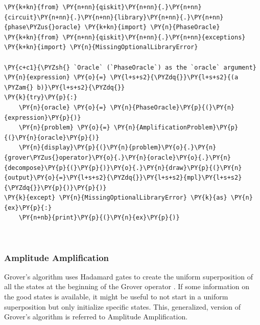     \begin{tcolorbox}[breakable, size=fbox, boxrule=1pt, pad at break*=1mm,colback=cellbackground, colframe=cellborder]
\begin{Verbatim}[commandchars=\\\{\}]
\PY{k+kn}{from} \PY{n+nn}{qiskit}\PY{n+nn}{.}\PY{n+nn}{circuit}\PY{n+nn}{.}\PY{n+nn}{library}\PY{n+nn}{.}\PY{n+nn}{phase\PYZus{}oracle} \PY{k+kn}{import} \PY{n}{PhaseOracle}
\PY{k+kn}{from} \PY{n+nn}{qiskit}\PY{n+nn}{.}\PY{n+nn}{exceptions} \PY{k+kn}{import} \PY{n}{MissingOptionalLibraryError}

\PY{c+c1}{\PYZsh{} `Oracle` (`PhaseOracle`) as the `oracle` argument}
\PY{n}{expression} \PY{o}{=} \PY{l+s+s2}{\PYZdq{}}\PY{l+s+s2}{(a \PYZam{} b)}\PY{l+s+s2}{\PYZdq{}}
\PY{k}{try}\PY{p}{:}
    \PY{n}{oracle} \PY{o}{=} \PY{n}{PhaseOracle}\PY{p}{(}\PY{n}{expression}\PY{p}{)}
    \PY{n}{problem} \PY{o}{=} \PY{n}{AmplificationProblem}\PY{p}{(}\PY{n}{oracle}\PY{p}{)}
    \PY{n}{display}\PY{p}{(}\PY{n}{problem}\PY{o}{.}\PY{n}{grover\PYZus{}operator}\PY{o}{.}\PY{n}{oracle}\PY{o}{.}\PY{n}{decompose}\PY{p}{(}\PY{p}{)}\PY{o}{.}\PY{n}{draw}\PY{p}{(}\PY{n}{output}\PY{o}{=}\PY{l+s+s2}{\PYZdq{}}\PY{l+s+s2}{mpl}\PY{l+s+s2}{\PYZdq{}}\PY{p}{)}\PY{p}{)}
\PY{k}{except} \PY{n}{MissingOptionalLibraryError} \PY{k}{as} \PY{n}{ex}\PY{p}{:}
    \PY{n+nb}{print}\PY{p}{(}\PY{n}{ex}\PY{p}{)}
\end{Verbatim}
\end{tcolorbox}

    \begin{center}
    \end{center}
    { \hspace*{\fill} \\}
    
    \hypertarget{amplitude-amplification}{%
\subsubsection*{Amplitude Amplification}\label{amplitude-amplification}}

Grover's algorithm uses Hadamard gates to create the uniform
superposition of all the states at the beginning of the Grover operator
. If some information on the good states is available, it might be
useful to not start in a uniform superposition but only initialize
specific states. This, generalized, version of Grover's algorithm is
referred to Amplitude Amplification.

